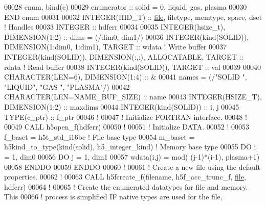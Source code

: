 \begin{DoxyCode}
00028   enum, bind(c)
00029      enumerator :: solid = 0, liquid, gas, plasma
00030 \textcolor{keyword}{  END }enum
00031 
00032   \textcolor{keywordtype}{INTEGER(HID\_T)} :: \hyperlink{structfile}{file}, filetype, memtype, space, dset \textcolor{comment}{! Handles}
00033   \textcolor{keywordtype}{INTEGER} :: hdferr
00034 
00035   \textcolor{keywordtype}{INTEGER(hsize\_t)},   \textcolor{keywordtype}{DIMENSION(1:2)} :: dims = (/dim0, dim1/)
00036   \textcolor{keywordtype}{INTEGER(kind(SOLID))}, \textcolor{keywordtype}{DIMENSION(1:dim0, 1:dim1)}, \textcolor{keywordtype}{TARGET} :: wdata \textcolor{comment}{! Write buffer}
00037   \textcolor{keywordtype}{INTEGER(kind(SOLID))}, \textcolor{keywordtype}{DIMENSION(:,:)}, \textcolor{keywordtype}{ALLOCATABLE}, \textcolor{keywordtype}{TARGET} :: rdata \textcolor{comment}{! Read buffer}
00038   \textcolor{keywordtype}{INTEGER(kind(SOLID))}, \textcolor{keywordtype}{TARGET} :: val
00039 
00040   \textcolor{keywordtype}{CHARACTER(LEN=6)}, \textcolor{keywordtype}{DIMENSION(1:4)} :: &
00041        names = (/\textcolor{stringliteral}{"SOLID "}, \textcolor{stringliteral}{"LIQUID"}, \textcolor{stringliteral}{"GAS   "}, \textcolor{stringliteral}{"PLASMA"}/)
00042   \textcolor{keywordtype}{CHARACTER(LEN=NAME\_BUF\_SIZE)} :: name
00043   \textcolor{keywordtype}{INTEGER(HSIZE\_T)}, \textcolor{keywordtype}{DIMENSION(1:2)} :: maxdims
00044   \textcolor{keywordtype}{INTEGER(kind(SOLID))} :: i, j
00045   \textcolor{keywordtype}{TYPE}(c\_ptr) :: f\_ptr
00046   \textcolor{comment}{!}
00047   \textcolor{comment}{! Initialize FORTRAN interface.}
00048   \textcolor{comment}{!}
00049   \textcolor{keyword}{CALL }h5open\_f(hdferr)
00050   \textcolor{comment}{!}
00051   \textcolor{comment}{! Initialize DATA.}
00052   \textcolor{comment}{!}
00053   f\_baset   = h5t\_std\_i16be      \textcolor{comment}{! File base type}
00054   m\_baset   = h5kind\_to\_type(kind(solid), h5\_integer\_kind) \textcolor{comment}{! Memory base type}
00055   \textcolor{keywordflow}{DO} i = 1, dim0
00056      \textcolor{keywordflow}{DO} j = 1, dim1 
00057         wdata(i,j) = mod( (j-1)*(i-1), plasma+1)
00058 \textcolor{keywordflow}{     ENDDO}
00059 \textcolor{keywordflow}{  ENDDO}
00060   \textcolor{comment}{!}
00061   \textcolor{comment}{! Create a new file using the default properties.}
00062   \textcolor{comment}{!}
00063   \textcolor{keyword}{CALL }h5fcreate\_f(filename, h5f\_acc\_trunc\_f, \hyperlink{structfile}{file}, hdferr)
00064   \textcolor{comment}{!}
00065   \textcolor{comment}{! Create the enumerated datatypes for file and memory.  This}
00066   \textcolor{comment}{! process is simplified IF native types are used for the file,}

\end{DoxyCode}
